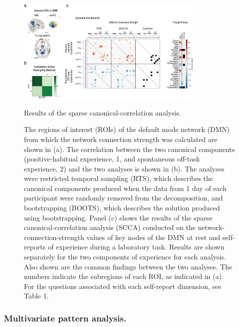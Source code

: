 \begin{figure}
	\centering
	\includegraphics[width=0.8\textwidth]{study1/image/study1fig2.jpeg}
	\caption{Results of the sparse canonical-correlation analysis.}
	\caption*{\footnotesize{The regions of interest (ROIs) of the default mode network (DMN) from which the network connection strength was calculated are shown in (a). The correlation between the two canonical components (positive-habitual experience, 1, and spontaneous off-task experience, 2) and the two analyses is shown in (b). The analyses were restricted temporal sampling (RTS), which describes the canonical components produced when the data from 1 day of each participant were randomly removed from the decomposition, and bootstrapping (BOOTS), which describes the solution produced using bootstrapping. Panel (c) shows the results of the sparse canonical-correlation analysis (SCCA) conducted on the network-connection-strength values of key nodes of the DMN at rest and self-reports of experience during a laboratory task. Results are shown separately for the two components of experience for each analysis. Also shown are the common findings between the two analyses. The numbers indicate the subregions of each ROI, as indicated in (a). For the questions associated with each self-report dimension, see Table 1.}}

	\label{fig:study1:fig2}
\end{figure}

\subsubsection{Multivariate pattern analysis.}

